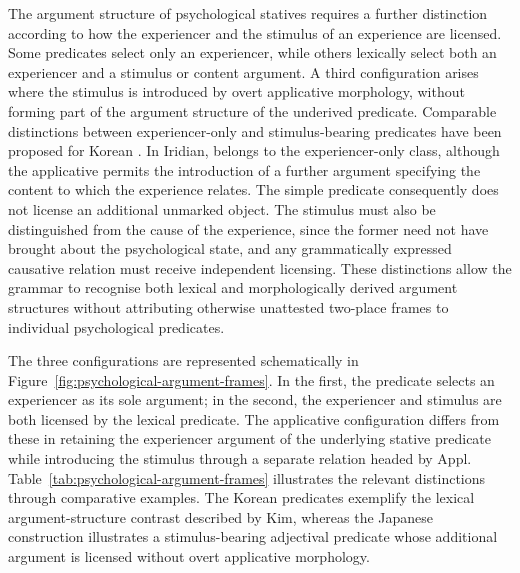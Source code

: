 The argument structure of psychological statives requires a further
distinction according to how the experiencer and the stimulus of an experience
are licensed. Some predicates select only an experiencer, while others
lexically select both an experiencer and a stimulus or content argument. A
third configuration arises where the stimulus is introduced by overt
applicative morphology, without forming part of the argument structure of the
underived predicate. Comparable distinctions between experiencer-only and
stimulus-bearing predicates have been proposed for Korean
\cite{kimyoonshin2026}. In Iridian,   belongs
to the experiencer-only class, although the applicative  permits
the introduction of a further argument specifying the content to which the
experience relates. The simple predicate consequently does not license an
additional unmarked object. The stimulus must also be distinguished from the
cause of the experience, since the former need not have brought about the
psychological state, and any grammatically expressed causative relation must
receive independent licensing. These distinctions allow the grammar to
recognise both lexical and morphologically derived argument structures without
attributing otherwise unattested two-place frames to individual psychological
predicates.

The three configurations are represented schematically in
Figure~\ref{fig:psychological-argument-frames}. In the first, the predicate
selects an experiencer as its sole argument; in the second, the experiencer and
stimulus are both licensed by the lexical predicate. The applicative
configuration differs from these in retaining the experiencer argument of the
underlying stative predicate while introducing the stimulus through a separate
relation headed by Appl. Table~\ref{tab:psychological-argument-frames}
illustrates the relevant distinctions through comparative examples. The Korean
predicates exemplify the lexical argument-structure contrast described by Kim,
whereas the Japanese construction illustrates a stimulus-bearing adjectival
predicate whose additional argument is licensed without overt applicative
morphology.

